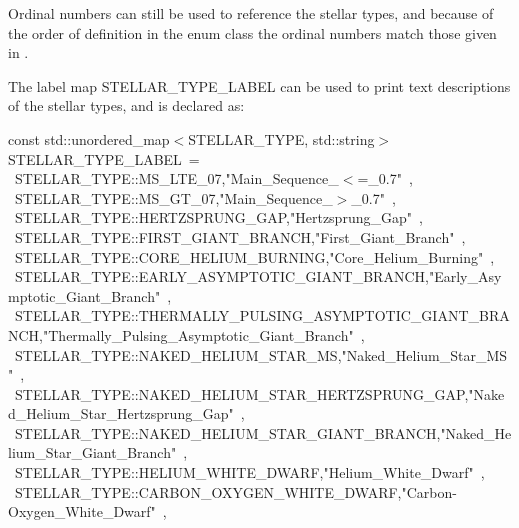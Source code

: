 \medskip
Ordinal numbers can still be used to reference the stellar types, and because of the order of definition in the enum class the ordinal numbers match those given in \citet{Hurley_2000}.

The label map STELLAR\_TYPE\_LABEL can be used to print text descriptions of the stellar types, and is declared as:

\footnotesize
const std::unordered\_map$<$STELLAR\_TYPE, std::string$>$ STELLAR\_TYPE\_LABEL\ =\ \lcb \\
\tabto{1.0em}\lcb\ STELLAR\_TYPE::MS\_LTE\_07,\tabto{35.5em}"Main\_Sequence\_$\mathrm{<}$=\_0.7"\ \rcb, \\
\tabto{1.0em}\lcb\ STELLAR\_TYPE::MS\_GT\_07,\tabto{35.5em}"Main\_Sequence\_$\mathrm{>}$\_0.7"\ \rcb, \\
\tabto{1.0em}\lcb\ STELLAR\_TYPE::HERTZSPRUNG\_GAP,\tabto{35.5em}"Hertzsprung\_Gap"\ \rcb, \\
\tabto{1.0em}\lcb\ STELLAR\_TYPE::FIRST\_GIANT\_BRANCH,\tabto{35.5em}"First\_Giant\_Branch"\ \rcb, \\
\tabto{1.0em}\lcb\ STELLAR\_TYPE::CORE\_HELIUM\_BURNING,\tabto{35.5em}"Core\_Helium\_Burning"\ \rcb, \\
\tabto{1.0em}\lcb\ STELLAR\_TYPE::EARLY\_ASYMPTOTIC\_GIANT\_BRANCH,\tabto{35.5em}"Early\_Asymptotic\_Giant\_Branch"\ \rcb, \\
\tabto{1.0em}\lcb~STELLAR\_TYPE::THERMALLY\_PULSING\_ASYMPTOTIC\_GIANT\_BRANCH,\tabto{35.5em}"Thermally\_Pulsing\_Asymptotic\_Giant\_Branch"~\rcb, \\
\tabto{1.0em}\lcb\ STELLAR\_TYPE::NAKED\_HELIUM\_STAR\_MS,\tabto{35.5em}"Naked\_Helium\_Star\_MS"\ \rcb, \\
\tabto{1.0em}\lcb\ STELLAR\_TYPE::NAKED\_HELIUM\_STAR\_HERTZSPRUNG\_GAP,\tabto{35.5em}"Naked\_Helium\_Star\_Hertzsprung\_Gap"\ \rcb, \\
\tabto{1.0em}\lcb\ STELLAR\_TYPE::NAKED\_HELIUM\_STAR\_GIANT\_BRANCH,\tabto{35.5em}"Naked\_Helium\_Star\_Giant\_Branch"\ \rcb, \\
\tabto{1.0em}\lcb\ STELLAR\_TYPE::HELIUM\_WHITE\_DWARF,\tabto{35.5em}"Helium\_White\_Dwarf"\ \rcb, \\
\tabto{1.0em}\lcb\ STELLAR\_TYPE::CARBON\_OXYGEN\_WHITE\_DWARF,\tabto{35.5em}"Carbon-Oxygen\_White\_Dwarf"\ \rcb, \\
